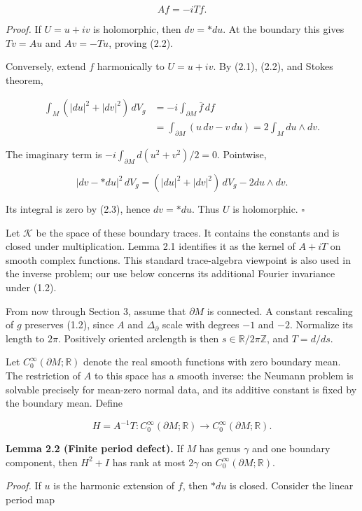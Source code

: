 \documentclass[11pt]{article}
\begin{document}
\[
Af=-iTf.
\tag{2.2}
\]

\emph{Proof.} If \(U=u+iv\) is holomorphic, then \(dv=*du\). At the
boundary this gives \(Tv=Au\) and \(Av=-Tu\), proving (2.2).

Conversely, extend \(f\) harmonically to \(U=u+iv\). By (2.1), (2.2),
and Stokes\textquotesingle{} theorem,

\[
\begin{aligned}
\int_M(|du|^2+|dv|^2)\,dV_g
&=-i\int_{\partial M}\overline f\,df\\
&=\int_{\partial M}(u\,dv-v\,du)
=2\int_M du\wedge dv.
\end{aligned}
\tag{2.3}
\]

The imaginary term is \(-i\int_{\partial M}d(u^2+v^2)/2=0\). Pointwise,

\[
|dv-*du|^2\,dV_g
=(|du|^2+|dv|^2)\,dV_g-2du\wedge dv.
\tag{2.4}
\]

Its integral is zero by (2.3), hence \(dv=*du\). Thus \(U\) is
holomorphic. \(\square\)

Let \(\mathcal K\) be the space of these boundary traces. It contains
the constants and is closed under multiplication. Lemma 2.1 identifies
it as the kernel of \(A+iT\) on smooth complex functions. This standard
trace-algebra viewpoint is also used in the inverse problem; our use
below concerns its additional Fourier invariance under (1.2).

From now through Section 3, assume that \(\partial M\) is connected. A
constant rescaling of \(g\) preserves (1.2), since \(A\) and
\(\Delta_\partial\) scale with degrees \(-1\) and \(-2\). Normalize its
length to \(2\pi\). Positively oriented arclength is then
\(s\in\mathbb R/2\pi\mathbb Z\), and \(T=d/ds\).

Let \(C^\infty_0(\partial M;\mathbb R)\) denote the real smooth
functions with zero boundary mean. The restriction of \(A\) to this
space has a smooth inverse: the Neumann problem is solvable precisely
for mean-zero normal data, and its additive constant is fixed by the
boundary mean. Define

\[
H=A^{-1}T:C^\infty_0(\partial M;\mathbb R)
\longrightarrow C^\infty_0(\partial M;\mathbb R).
\tag{2.5}
\]

\textbf{Lemma 2.2 (Finite period defect).} If \(M\) has genus \(\gamma\)
and one boundary component, then \(H^2+I\) has rank at most \(2\gamma\)
on \(C^\infty_0(\partial M;\mathbb R)\).

\emph{Proof.} If \(u\) is the harmonic extension of \(f\), then \(*du\)
is closed. Consider the linear period map
\end{document}
